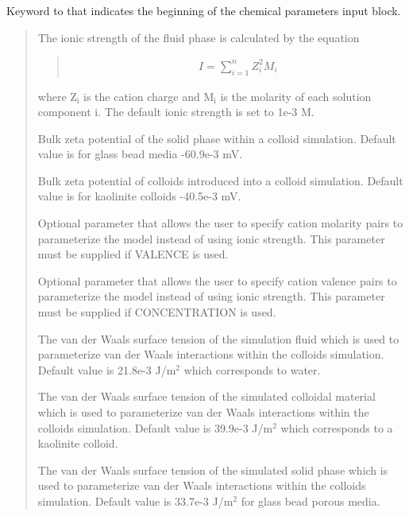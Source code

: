 \documentclass[letterpaper,10pt,english]{sphinxmanual}
\begin{document}
 Keyword to that indicates the
beginning of the chemical parameters input block.
\begin{quote}

 The ionic strength of the fluid phase is calculated
by the equation
\begin{quote}
\begin{equation*}
\begin{split}I =\sum_{i = 1}^{n}{Z_{i}^{2}M_{i}}\end{split}
\end{equation*}\end{quote}

where Z$_{\text{i}}$ is the cation charge and M$_{\text{i}}$ is the
molarity of each solution component i. The default ionic strength is
set to 1e-3 M.

 Bulk zeta potential of the solid phase
within a colloid simulation. Default value is for glass bead media
-60.9e-3 mV.

 Bulk zeta potential of colloids
introduced into a colloid simulation. Default value is for kaolinite
colloids -40.5e-3 mV.

 Optional parameter
that allows the user to specify cation molarity pairs to
parameterize the model instead of using ionic strength. This
parameter must be supplied if VALENCE is used.

 Optional parameter
that allows the user to specify cation valence pairs to parameterize
the model instead of using ionic strength. This parameter must be
supplied if CONCENTRATION is used.

 The van der Waals surface tension of
the simulation fluid which is used to parameterize van der Waals
interactions within the colloids simulation. Default value is
21.8e-3 J/m$^{\text{2}}$ which corresponds to water.

 The van der Waals surface tension of
the simulated colloidal material which is used to parameterize van
der Waals interactions within the colloids simulation. Default value
is 39.9e-3 J/m$^{\text{2}}$ which corresponds to a kaolinite colloid.

 The van der Waals surface tension of
the simulated solid phase which is used to parameterize van der
Waals interactions within the colloids simulation. Default value is
33.7e-3 J/m$^{\text{2}}$ for glass bead porous media.


\end{quote}
\end{document}
